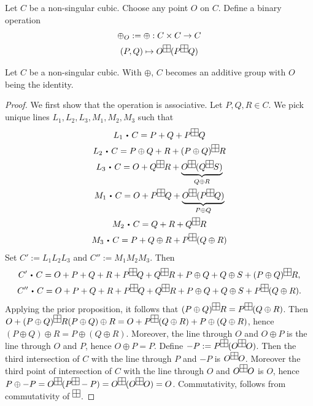     \begin{definition}
        Let $C$ be a non-singular cubic. Choose any point $O$ on $C$. Define a binary operation 
        \begin{gather*}
            \oplus_{O} := \oplus : C\times C \rightarrow C\\
            (P,Q)\mapsto O \squareplus ( P\squareplus Q)
        \end{gather*}
    \end{definition}
    \begin{proposition}
        Let $C$ be a non-singular cubic. With $\oplus$, $C$ becomes an additive group with $O$ being the identity. 
    \end{proposition}
    \begin{proof}
        We first show that the operation is associative. Let $P,Q,R\in C$. We pick unique lines $L_1,L_2,L_3,M_1,M_2,M_3$ such that 
        \begin{gather*}
            L_1 \ic C = P + Q + P\squareplus Q\\
            L_2 \ic C  = P\oplus Q + R + (P\oplus Q)\squareplus R\\
            L_3 \ic C = O + Q \squareplus R + \underbrace{ O \squareplus (Q \squareplus S)}_{Q \oplus R}\\
            M_1 \ic C = O + P \squareplus Q + \underbrace{ O \squareplus ( P \squareplus Q ) }_{P\oplus Q}\\
            M_2 \ic C = Q + R + Q \squareplus R\\
            M_3 \ic C = P + Q \oplus R + P \squareplus ( Q\oplus R)
        \end{gather*}
        Set $C' := L_1L_2L_3$ and $C'' := M_1M_2M_3$. Then 
        \begin{gather*}
            C'\ic C = O+P+Q+R+P \squareplus Q + Q \squareplus R + P \oplus Q + Q \oplus S + (P\oplus Q)\squareplus R,\\
            C'' \ic C = O+P+Q+R+P \squareplus Q + Q \squareplus R + P \oplus Q + Q \oplus S + P\squareplus(Q\oplus R).
        \end{gather*}
        Applying the prior proposition, it follows that $(P \oplus Q)\squareplus R = P \squareplus (Q\oplus R)$. Then $O+(P \oplus Q)\squareplus R (P\oplus Q)\oplus R = O+ P \squareplus (Q\oplus R) + P\oplus (Q\oplus R)$, hence $(P\oplus Q)\oplus R = P\oplus (Q\oplus R)$. Moreover, the line through $O$ and $O\oplus P$ is the line through $O$ and $P$, hence $O\oplus P = P$. Define $-P := P\squareplus (O \squareplus O)$. Then the third intersection of $C$ with the line through $P$ and $-P$ is $O\squareplus O$. Moreover the third point of intersection of $C$ with the line through $O$ and $O\squareplus O$ is $O$, hence $P\oplus -P = O\squareplus (P \squareplus -P)= O \squareplus (O\squareplus O)= O$. Commutativity, follows from commutativity of $\squareplus$.
    \end{proof}
